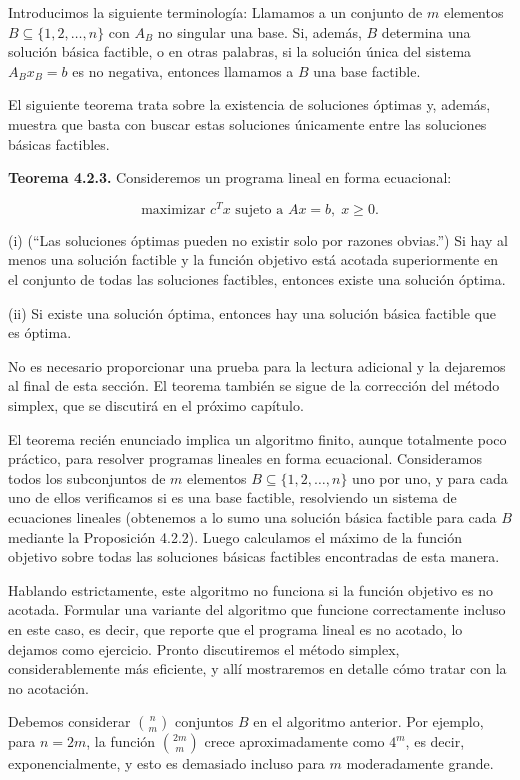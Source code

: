\documentclass{article}
\begin{document}
Introducimos la siguiente terminología: Llamamos a un conjunto de \( m \) elementos \( B \subseteq \{1, 2, \ldots, n\} \) con \( A_B \) no singular una base. Si, además, \( B \) determina una solución básica factible, o en otras palabras, si la solución única del sistema \( A_B x_B = b \) es no negativa, entonces llamamos a \( B \) una base factible.

El siguiente teorema trata sobre la existencia de soluciones óptimas y, además, muestra que basta con buscar estas soluciones únicamente entre las soluciones básicas factibles.

\textbf{Teorema 4.2.3.} Consideremos un programa lineal en forma ecuacional:

\[
\text{maximizar } c^T x \text{ sujeto a } A x = b, \; x \geq 0.
\]

(i) (“Las soluciones óptimas pueden no existir solo por razones obvias.”) Si hay al menos una solución factible y la función objetivo está acotada superiormente en el conjunto de todas las soluciones factibles, entonces existe una solución óptima.

(ii) Si existe una solución óptima, entonces hay una solución básica factible que es óptima.

No es necesario proporcionar una prueba para la lectura adicional y la dejaremos al final de esta sección. El teorema también se sigue de la corrección del método simplex, que se discutirá en el próximo capítulo.

El teorema recién enunciado implica un algoritmo finito, aunque totalmente poco práctico, para resolver programas lineales en forma ecuacional. Consideramos todos los subconjuntos de \( m \) elementos \( B \subseteq \{1, 2, \ldots, n\} \) uno por uno, y para cada uno de ellos verificamos si es una base factible, resolviendo un sistema de ecuaciones lineales (obtenemos a lo sumo una solución básica factible para cada \( B \) mediante la Proposición 4.2.2). Luego calculamos el máximo de la función objetivo sobre todas las soluciones básicas factibles encontradas de esta manera.

Hablando estrictamente, este algoritmo no funciona si la función objetivo es no acotada. Formular una variante del algoritmo que funcione correctamente incluso en este caso, es decir, que reporte que el programa lineal es no acotado, lo dejamos como ejercicio. Pronto discutiremos el método simplex, considerablemente más eficiente, y allí mostraremos en detalle cómo tratar con la no acotación.

Debemos considerar \( \binom{n}{m} \) conjuntos \( B \) en el algoritmo anterior. Por ejemplo, para \( n = 2m \), la función \( \binom{2m}{m} \) crece aproximadamente como \( 4^m \), es decir, exponencialmente, y esto es demasiado incluso para \( m \) moderadamente grande.
\end{document}

